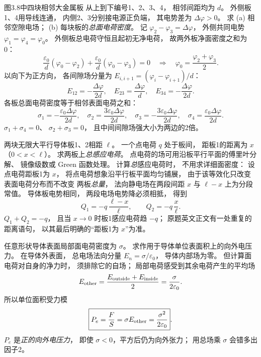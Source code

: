 图3.8中四块相邻大金属板
从上到下编号1、2、3、4，
相邻间距均为 $d$。
外侧板1、4用导线连通，
内侧2、3分别接电源正负端，
其电势差为 $\Delta\varphi>0$。
求 (a) 相邻空隙电场；
(b) 每块板的\emph{总面电荷密度}。
\exsolution
记 $\varphi_2-\varphi_3=\Delta\varphi$，
外侧共同电势
$\varphi_1=\varphi_4=\varphi_0$。
外侧板总电荷守恒且起初无净电荷，
故两外板净面密度之和为0：
\[
\frac{\varepsilon_0}{d}(\varphi_0-\varphi_2)
+\frac{\varepsilon_0}{d}(\varphi_0-\varphi_3)=0
\quad\Longrightarrow\quad
\varphi_0=\frac{\varphi_2+\varphi_3}{2}.
\]
以向下为正方向，
各间隙场分量为
$E_{i,i+1}=(\varphi_i-\varphi_{i+1})/d$：
\[
\boxed{E_{12}=-\frac{\Delta\varphi}{2d},\quad
E_{23}=\frac{\Delta\varphi}{d},\quad
E_{34}=-\frac{\Delta\varphi}{2d}}.
\]
各板总面电荷密度等于相邻表面电荷之和：
\[
\boxed{\sigma_1=-\frac{\varepsilon_0\Delta\varphi}{2d},
\quad \sigma_2=\frac{3\varepsilon_0\Delta\varphi}{2d},
\quad \sigma_3=-\frac{3\varepsilon_0\Delta\varphi}{2d},
\quad \sigma_4=\frac{\varepsilon_0\Delta\varphi}{2d}}.
\]
\excheck $\sigma_1+\sigma_4=0$、
$\sigma_2+\sigma_3=0$，
且中间间隙场强大小为两边的2倍。

两块无限大平行导体板1、2相距 $\ell$。
一个点电荷 $q$ 处于板间，
距板1的距离为 $x$（$0<x<\ell$）。
求两板上\emph{总感应电荷}。
\exsolution
点电荷的场可用沿板平行平面的傅里叶分解、
镜像级数或 Green 函数处理。
计算\emph{总}感应电荷时，
不用求详细面密度：
设点电荷距板1为 $x$，
将点电荷想象沿平行板平面均匀铺展，
由于该等效化只改变表面电荷分布而不改变
两板\emph{总量}，
法向静电场在两段间距
$x$ 与 $\ell-x$ 上为分段常值。
导体板电势相同，
两段电场电势降必须相抵，
得到
\[
\boxed{Q_1=-q\,\frac{\ell-x}{\ell}},
\qquad
\boxed{Q_2=-q\,\frac{x}{\ell}}.
\]
\excheck $Q_1+Q_2=-q$，
且当 $x\to0$ 时板1感应电荷趋 $-q$；
原题英文正文有一处重复的距离语句，
以其最后明确的“距板1为 $x$”为准。

任意形状导体表面局部面电荷密度为 $\sigma$。
求作用于导体单位表面积上的向外电压力。
\exsolution
在导体外表面，
总电场法向分量
$E_n=\sigma/\varepsilon_0$，
导体内部场为零。
但计算面电荷对自身的净力时，
须排除它的自场；
局部电荷感受到其余电荷产生的平均场
\[
E_{\rm other}=
\frac{E_{\rm outside}+E_{\rm inside}}2
=\frac{\sigma}{2\varepsilon_0}.
\]
所以单位面积受力模
\[
\boxed{P_e=\frac FS=
\sigma E_{\rm other}=
\frac{\sigma^2}{2\varepsilon_0}}.
\]
\excheck $P_e$ 是\emph{正的向外电压力}，
即使 $\sigma<0$，平方后仍为向外张力；
用总场乘 $\sigma$ 会错多出因子2。

